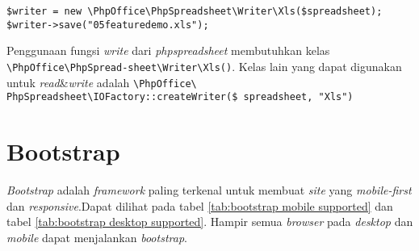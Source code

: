 \begin{lstlisting}
$writer = new \PhpOffice\PhpSpreadsheet\Writer\Xls($spreadsheet);
$writer->save("05featuredemo.xls");
\end{lstlisting}

Penggunaan fungsi \textit{write} dari \textit{phpspreadsheet} membutuhkan kelas \texttt{\textbackslash PhpOffice\textbackslash PhpSpread-\newline sheet\textbackslash Writer\textbackslash Xls()}. Kelas lain yang dapat digunakan untuk \textit{read}\&\textit{write} adalah \texttt{\textbackslash PhpOffice\textbackslash\\ PhpSpreadsheet\textbackslash IOFactory::createWriter(\$ spreadsheet, "Xls")}

\section{Bootstrap}
\textit{Bootstrap} adalah \textit{framework} paling terkenal untuk membuat \textit{site} yang \textit{mobile-first} dan \textit{res\-pon\-sive}\cite{bootstrap}.Dapat dilihat pada tabel \ref{tab:bootstrap mobile supported} dan tabel \ref{tab:bootstrap desktop supported}.  Hampir semua \textit{browser} pada \textit{desktop} dan \textit{mobile} dapat menjalankan \textit{bootstrap}.

\begin{table}[H]
	\centering
	\caption{\textit{Browser Mobile} yang mendukung \textit{bootstrap}}
	\label{tab:bootstrap mobile supported}
\end{table}

